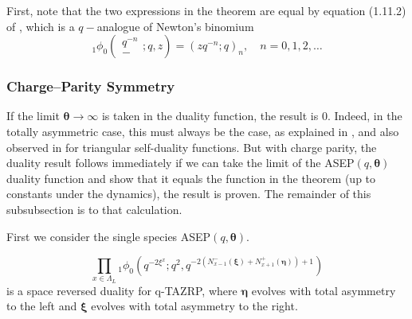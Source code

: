 \documentclass{ximera}
\begin{document}
First, note that the two expressions in the theorem are equal by equation (1.11.2) of \cite{KLS}, which is a $q-$analogue of Newton’s binomium
$$ 
{ }_{1} \phi_{0}\left(\begin{array}{c}q^{-n} \\ -\end{array} ;q, z\right)=\left(z q^{-n} ; q\right)_{n}, \quad n=0,1,2, \ldots
$$

 
 
\subsubsection{Charge--Parity Symmetry}
If the limit $\boldsymbol\theta\rightarrow \infty$ is taken in the duality function, the result is $0$. Indeed, in the totally asymmetric case, this must always be the case, as explained in \cite{Kuan-IMRN}, and also observed in \cite{CGRS} for triangular self-duality functions. But with charge parity, the duality result follows immediately if we can take the limit of the ASEP$(q,\boldsymbol\theta)$ duality function and show that it equals the function in the theorem (up to  constants under the dynamics), the result is proven. The remainder of this subsubsection is to that calculation. 


First we consider the single species ASEP$(q,\boldsymbol\theta)$.
\begin{theorem}\label{thm: 4.6}
\begin{equation}
    \prod_{x \in \Lambda_L} {}_1\phi_0\left(q^{-2\xi^x};q^2,q^{-2\left(N_{x-1}^-(\boldsymbol\xi)+N_{x+1}^+(\boldsymbol\eta)\right)+1}\right)
\end{equation}
is a space reversed duality for q-TAZRP, where $\boldsymbol\eta$ evolves with total asymmetry to the left and $\boldsymbol\xi$ evolves with total asymmetry to the right.
\end{theorem}
\end{document}
